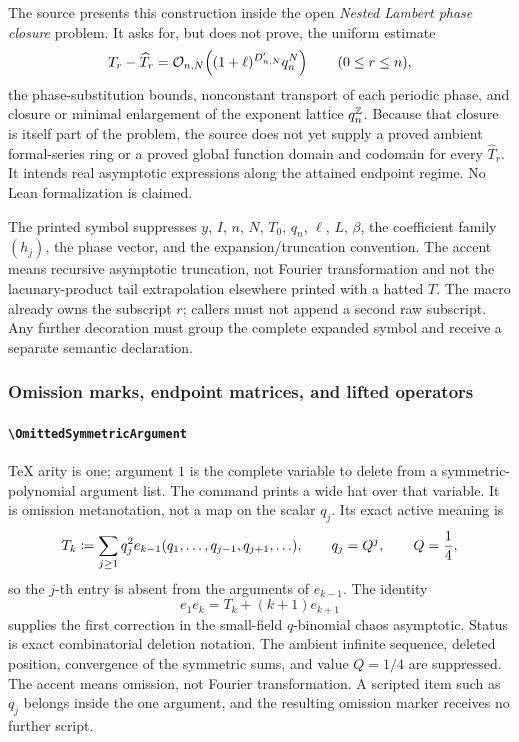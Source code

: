 \documentclass[11pt,oneside]{article}
\theoremstyle{definition}
\theoremstyle{remark}
\DeclareRobustCommand{\commandname}[1]{\texttt{\textbackslash#1}}
\DeclareRobustCommand{\localaccentname}[1]{\commandname{#1}}
\begin{document}
The source presents this construction inside the open
\emph{Nested Lambert phase closure} problem.  It asks for, but does not prove,
the uniform estimate
\[
 T_r-\widehat T_r
 =
 \mathcal{O}_{n,N}\!\left((1+\ell)^{D'_{n,N}}q_n^N\right)
 \qquad(0\le r\le n),
\]
the phase-substitution bounds, nonconstant transport of each periodic phase,
and closure or minimal enlargement of the exponent lattice
\(q_n^{\mathbb{Z}}\).  Because that closure is itself part of the
problem, the source does not yet supply a proved ambient formal-series ring
or a proved global function domain and codomain for every \(\widehat T_r\).
It intends real asymptotic expressions along the attained endpoint regime.
No Lean formalization is claimed.

The printed symbol suppresses \(y\), \(I\), \(n\), \(N\), \(T_0\), \(q_n\),
\(\ell\), \(L\), \(\beta\), the coefficient family \((h_j)\), the phase
vector, and the expansion/truncation convention.  The accent means recursive
asymptotic truncation, not Fourier transformation and not the
lacunary-product tail extrapolation elsewhere printed with a hatted \(T\).
The macro already owns the subscript \(r\); callers must not append a second
raw subscript.  Any further decoration must group the complete expanded
symbol and receive a separate semantic declaration.

\subsubsection{Omission marks, endpoint matrices, and lifted operators}

\paragraph{\localaccentname{OmittedSymmetricArgument}}
TeX arity is one; argument \(1\) is the complete variable to delete from a
symmetric-polynomial argument list.  The command prints a wide hat over that
variable.  It is omission metanotation, not a map on the scalar \(q_j\).
Its exact active meaning is
\[
 T_k
 \mathrel{\coloneqq}
 \sum_{j\ge1}q_j^2
 e_{k-1}(q_1,\ldots,q_{j-1},q_{j+1},\ldots),
 \qquad
 q_j=Q^j,\qquad Q=\frac14,
\]
so the \(j\)-th entry is absent from the arguments of \(e_{k-1}\).  The
identity
\[
 e_1e_k=T_k+(k+1)e_{k+1}
\]
supplies the first correction in the small-field \(q\)-binomial chaos
asymptotic.  Status is exact combinatorial deletion notation.  The ambient
infinite sequence, deleted position, convergence of the symmetric sums, and
value \(Q=1/4\) are suppressed.  The accent means omission, not Fourier
transformation.  A scripted item such as \(q_j\) belongs inside the one
argument, and the resulting omission marker receives no further script.
\end{document}

